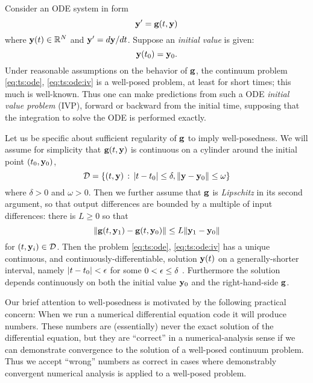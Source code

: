 Consider an ODE system in form
\begin{equation}
\mathbf{y}' = \mathbf{g}(t,\mathbf{y})  \label{eq:ts:ode}
\end{equation}
where $\mathbf{y}(t) \in \mathbb{R}^N$ and $\mathbf{y}'=d\mathbf{y}/dt$.  Suppose an \emph{initial value} is given:
\begin{equation}
\mathbf{y}(t_0) = \mathbf{y}_0.  \label{eq:ts:ode:iv}
\end{equation}
Under reasonable assumptions on the behavior of $\mathbf{g}$, the continuum problem \eqref{eq:ts:ode}, \eqref{eq:ts:ode:iv} is a well-posed problem, at least for short times; this much is well-known.  Thus one can make predictions from such a ODE \emph{initial value problem} (IVP), forward or backward from the initial time, supposing that the integration to solve the ODE is performed exactly.

Let us be specific about sufficient regularity of $\mathbf{g}$ to imply well-posedness.  We will assume for simplicity that $\mathbf{g}(t,\mathbf{y})$ is continuous on a cylinder around the initial point $(t_0,\mathbf{y}_0)$,
   $$\mathcal{D} = \{(t,\mathbf{y}) \,:\, |t-t_0| \le \delta, \|\mathbf{y} - \mathbf{y}_0\| \le \omega\}$$
where $\delta > 0$ and $\omega > 0$.  Then we further assume that $\mathbf{g}$ is \emph{Lipschitz} in its second argument, so that output differences are bounded by a multiple of input differences: there is $L\ge 0$ so that
\begin{equation}
\|\mathbf{g}(t,\mathbf{y}_1) - \mathbf{g}(t,\mathbf{y}_0)\| \le L \|\mathbf{y}_1-\mathbf{y}_0\|  \label{eq:ts:glipschitz}
\end{equation}
for $(t,\mathbf{y}_i) \in \mathcal{D}$.  Then the problem \eqref{eq:ts:ode}, \eqref{eq:ts:ode:iv} has a unique continuous, and continuously-differentiable, solution $\mathbf{y}(t)$ on a generally-shorter interval, namely $|t-t_0|<\epsilon$ for some $0 < \epsilon \le \delta$ \citep[section 17.5]{HirschSmaleDevaney2004}.  Furthermore the solution depends continuously on both the initial value $\mathbf{y}_0$ and the right-hand-side $\mathbf{g}$.

Our brief attention to well-posedness is motivated by the following practical concern:  When we run a numerical differential equation code it will produce numbers.  These numbers are (essentially) never the exact solution of the differential equation, but they are ``correct'' in a numerical-analysis sense if we can demonstrate convergence to the solution of a well-posed continuum problem.  Thus we accept ``wrong'' numbers as correct in cases where demonstrably convergent numerical analysis is applied to a well-posed problem.

